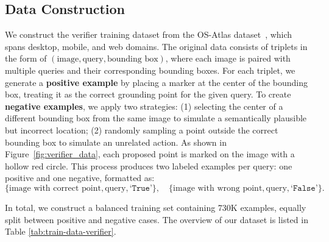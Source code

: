 \documentclass{article}
\begin{document}
\subsection{Data Construction}
\label{appendix:data_verifier}
We construct the verifier training dataset from the OS-Atlas dataset~\cite{wu2024atlas}, which spans desktop, mobile, and web domains. The original data consists of triplets in the form of $(\text{image}, \text{query}, \text{bounding box})$, where each image is paired with multiple queries and their corresponding bounding boxes. For each triplet, we generate a \textbf{positive example} by placing a marker at the center of the bounding box, treating it as the correct grounding point for the given query.
To create \textbf{negative examples}, we apply two strategies:
(1) selecting the center of a different bounding box from the same image to simulate a semantically plausible but incorrect location; (2) randomly sampling a point outside the correct bounding box to simulate an unrelated action. As shown in Figure~\ref{fig:verifier_data}, each proposed point is marked on the image with a hollow red circle. This process produces two labeled examples per query: one positive and one negative, formatted as:
\[
\{\text{image with correct point}, \text{query}, \texttt{`True'}\}, \quad \{\text{image with wrong point}, \text{query}, \texttt{`False'}\} .
\]

In total, we construct a balanced training set containing 730K examples, equally split between positive and negative cases. The overview of our dataset is listed in Table \ref{tab:train-data-verifier}.
\end{document}
